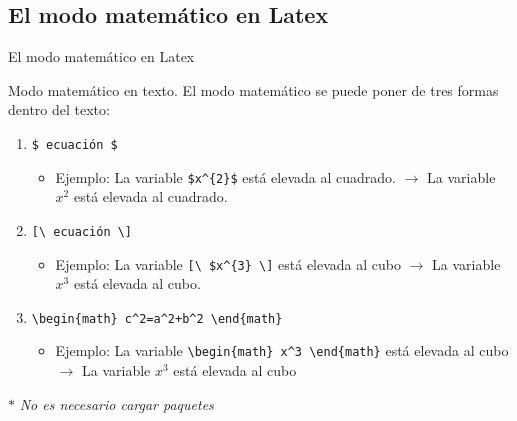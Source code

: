 \documentclass[aspectratio=169, 10pt]{beamer}
\begin{document}
\subsection{El modo matemático en Latex}
\begin{frame}[fragile]{El modo matemático en Latex}
    \begin{block}{Modo matemático en texto.}
        El modo matemático se puede poner de tres formas dentro del texto:
        \begin{enumerate}
            \item \verb|$ ecuación $| 
            \begin{itemize}
                \item Ejemplo: La variable \verb|$x^{2}$| está elevada al cuadrado. \hspace{1mm} $ \rightarrow $ \hspace{1mm} La variable $x^{2}$ está elevada al cuadrado.
            \end{itemize}
            \item \verb|[\ ecuación \]|
            \begin{itemize}
                \item Ejemplo: La variable \verb|[\ $x^{3} \]| está elevada al cubo \hspace{1mm} $ \rightarrow $ \hspace{1mm} La variable $x^{3}$ está elevada al cubo.
            \end{itemize}
            \item \verb|\begin{math} c^2=a^2+b^2 \end{math}| 
            \begin{itemize}
                \item Ejemplo: La variable \verb|\begin{math} x^3 \end{math}| está elevada al cubo \hspace{1mm} $\rightarrow$ \hspace{1mm} La variable \begin{math}
                    x^3 \end{math} está elevada al cubo
            \end{itemize}
        \end{enumerate}
    \end{block}

    $\ast$ \textit{No es necesario cargar paquetes}
    
\end{frame}
\end{document}
